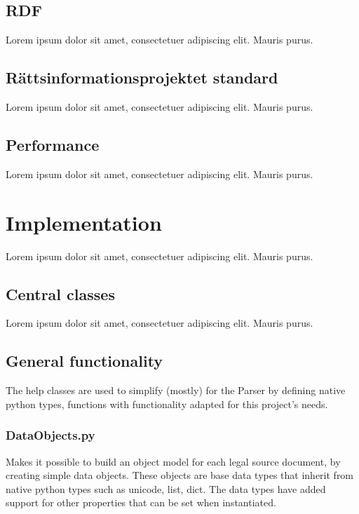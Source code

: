 \documentclass[a4paper,11pt]{kth-mag}
\begin{document}
\section{RDF}

Lorem ipsum dolor sit amet, consectetuer adipiscing elit. Mauris
purus.

\section{Rättsinformationsprojektet standard}

Lorem ipsum dolor sit amet, consectetuer adipiscing elit. Mauris
purus.  

\section{Performance}

Lorem ipsum dolor sit amet, consectetuer adipiscing elit. Mauris
purus. 

\chapter{Implementation}

Lorem ipsum dolor sit amet, consectetuer adipiscing elit. Mauris
purus. 

\section{Central classes}

Lorem ipsum dolor sit amet, consectetuer adipiscing elit. Mauris
purus. 

\section{General functionality}

The help classes are used to simplify (mostly) for the Parser by defining native python types, functions with functionality adapted for this project's needs.  

\subsection{DataObjects.py}

Makes it possible to build an object model for each legal source document, by
creating simple data objects. These objects are base data types that inherit
from native python types such as unicode, list, dict. The data types have
added support for other properties that can be set when instantiated.
\end{document}
